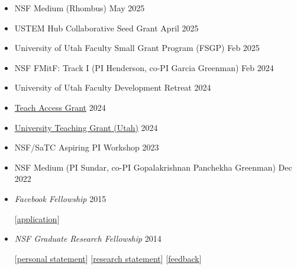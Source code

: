 \documentclass{article}
\begin{document}
\begin{itemize}
  \item NSF Medium (Rhombus) \hfill May 2025
  \item USTEM Hub Collaborative Seed Grant \hfill April 2025
  \item University of Utah Faculty Small Grant Program (FSGP) \hfill Feb 2025
  \item NSF FMitF: Track I (PI Henderson, co-PI Garcia Greenman) \hfill Feb 2024
  \item University of Utah Faculty Development Retreat \hfill 2024
  \item \href{https://teachaccess.org/initiatives/grants/}{Teach Access Grant}  \hfill 2024
  \item \href{https://academic-affairs.utah.edu/awards-nominations/university-teaching-committee/university-teaching-grants/}{University Teaching Grant (Utah)} \hfill 2024
\item NSF/SaTC Aspiring PI Workshop \hfill 2023
\item NSF Medium (PI Sundar, co-PI Gopalakrishnan Panchekha Greenman) \hfill Dec 2022
\item \emph{Facebook Fellowship} \hfill 2015
\item[] [\href{http://cs.utah.edu/~blg/cv/failures/facebook-2015-reject.pdf}{application}]
\item \emph{NSF Graduate Research Fellowship} \hfill 2014
\item[] [\href{https://cs.utah.edu/~blg/cv/failures/nsf-2014-personal-reject.pdf}{personal statement}]
        [\href{https://cs.utah.edu/~blg/cv/failures/nsf-2014-research-reject.pdf}{research statement}]
        [\href{https://cs.utah.edu/~blg/cv/failures/nsf-2014-reject-response.pdf}{feedback}]
\end{itemize}


\end{document}
